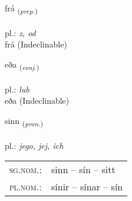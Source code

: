\documentclass[frontgrid, backgrid]{flacards}\usepackage[]{graphicx}\usepackage[]{xcolor}
\begin{document}
{frá \small{\textsubscript{(\textit{prep.})}} \\[1ex]
\textphonetic{[frauː]} \\
pl.: \emph{z, od} \\  [2ex]
frá (Indeclinable)}


\renewcommand{\flhead}{\vskip5pt \fboxsep=0pt {\small\bfseries\footnotesize Samtenging | Conjuction}}
\renewcommand{\fcfoot}{\vskip5pt \fboxsep=0pt \hspace{2pt}{\small\bfseries\footnotesize 1K}}

\renewcommand{\blhead}{\vskip5pt {\small\bfseries\footnotesize Samtenging | Conjuction }}
\renewcommand{\bcfoot}{\vskip5pt \hspace{2pt}{\small\bfseries\footnotesize 1K}}


{eða \small{\textsubscript{(\textit{conj.})}} \\[1ex]
\textphonetic{[ɛːða]} \\
pl.: \emph{lub} \\  [2ex]
eða (Indeclinable)}

\renewcommand{\flhead}{\vskip5pt \fboxsep=0pt {\small\bfseries\footnotesize Fornafn | Pronoun}}
\renewcommand{\fcfoot}{\vskip5pt \fboxsep=0pt \hspace{2pt}{\small\bfseries\footnotesize 1K}}

\renewcommand{\blhead}{\vskip5pt {\small\bfseries\footnotesize Fornafn | Pronoun }}
\renewcommand{\bcfoot}{\vskip5pt \hspace{2pt}{\small\bfseries\footnotesize 1K}}


{sinn \small{\textsubscript{(\textit{pron.})}} \\[1ex] %
\textphonetic{[sɪn]} \\
pl.: \emph{jego, jej, ich} \\  [2ex]
\renewcommand*{\arraystretch}{0.8}
\begin{tabular}{ll}
\textsc{sg.nom.}: & sinn  --  sín -- sitt \\ 
\textsc{pl.nom.}: & sínir -- sínar -- sín
\end{tabular}
}
\end{document}
